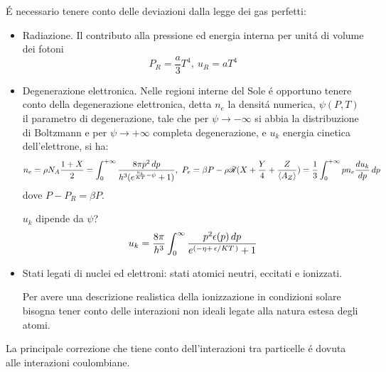 \documentclass[../main.tex]{subfiles}
\begin{document}
\'E necessario tenere conto delle deviazioni dalla legge dei gas perfetti:
\begin{itemize}

\item Radiazione. Il contributo alla pressione ed energia interna per unit\'a di volume dei fotoni 
\begin{equation}
P_R=\frac{a}{3}T^4,\ u_R=aT^4
\end{equation}

\item Degenerazione elettronica. Nelle regioni interne del Sole \'e opportuno tenere conto della degenerazione elettronica, detta $n_e$ la densit\'a numerica, $\psi(P,T)$ il parametro di degenerazione, tale che per $\psi\to-\infty$ si abbia la distribuzione di Boltzmann e per $\psi\to+\infty$ completa degenerazione, e $u_k$ energia cinetica dell'elettrone, si ha:
\begin{equation}
n_e=\rho N_A\frac{1+X}{2}=\intzi{}\frac{8\pi p^2\,dp}{h^3(\exp{\frac{u_k}{KT}-\psi}+1)},\ P_e=\beta P-\rho\gasconstant{}(X+\frac{Y}{4}+\frac{Z}{\exv{A_Z}})=\frac{1}{3}\intzi{}pn_e\TDy{p}{u_k}\,dp
\end{equation}
dove $P-P_R=\beta P$.

\begin{workout}
$u_k$ dipende da $\psi$?
\begin{equation}
u_k=\frac{8\pi}{h^3}\int_0^{\infty}\frac{p^2\epsilon(p)\,dp}{\exp{(-\eta+\midfrac{\epsilon}{KT})}+1}
\end{equation}

\end{workout}

\item Stati legati di nuclei ed elettroni: stati atomici neutri, eccitati e ionizzati.

Per avere una descrizione realistica della ionizzazione in condizioni solare bisogna tener conto delle interazioni non ideali legate alla natura estesa degli atomi.

\end{itemize}

La principale correzione che tiene conto dell'interazioni tra particelle \'e dovuta alle interazioni coulombiane.

\begin{workout}

\end{workout}
\end{document}
